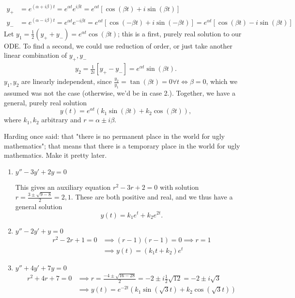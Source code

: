 \begin{enumerate}
    \begin{align*}
        y_+ &= e^{(\alpha + i \beta)t} = e^{\alpha t}e^{i \beta t}= e^{\alpha t}[\cos (\beta t) + i \sin (\beta t)]\\
        y_- &= e^{(\alpha - i \beta )t} = e^{\alpha t}e^{-i \beta t}= e^{\alpha t}[\cos (-\beta t) + i \sin (-\beta t)] = e^{\alpha t}[\cos (\beta t) - i \sin (\beta t)]
    \end{align*}
    Let $y_1 = \frac{1}{2}(y_+ + y_-) = e^{\alpha t} \cos(\beta t)$; this is a first, purely real solution to our ODE. To find a second, we could use reduction of order, or just take another linear combination of $y_+, y_-$
    \begin{align*}
        y_2 = \frac{1}{2i}[y_+ - y_-] = e^{\alpha t}\sin (\beta t).
    \end{align*}
    $y_1, y_2$ are linearly independent, since $\frac{y_2}{y_1} = \tan (\beta t) = 0 \forall t \iff \beta = 0$, which we assumed was not the case (otherwise, we'd be in case 2.).
    Together, we have a general, purely real solution \[
    y(t) = e^{\alpha t}(k_1\sin(\beta t) +k_2\cos (\beta t)),    
    \]
    where $k_1, k_2$ arbitrary and $r = \alpha \pm i \beta$.
\end{enumerate}

\begin{mdframed}[backgroundcolor=gray!20]
    \begin{center}
    Harding once said: that "there is no permanent place in the world for ugly mathematics"; that means that there is a temporary place in the world for ugly mathematics. Make it pretty later.
    \end{center}
\end{mdframed}


\begin{example}
    \begin{enumerate}
        \item $y'' - 3y' + 2y = 0$ 
        
        This gives an auxiliary equation $r^2 - 3r + 2 = 0$ with solution $r = \frac{3 \pm \sqrt{9 - 8}}{2} = 2, 1$. These are both positive and real, and we thus have a general solution \[
        y(t) = k_1 e^{t} + k_2e^{2t}.    
        \]
        \item $y''-2y'+y = 0$
        \begin{align*}
            r^2 - 2r + 1 = 0 &\implies (r-1)(r-1) = 0 \implies r = 1\\
            &\implies y(t) = (k_1t+k_2)e^{t}
        \end{align*}
        \item $y''+4y'+7y = 0$
        \begin{align*}
            r^2 + 4r + 7 = 0 &\implies r = \frac{-4 \pm \sqrt{16-28}}{2}= -2 \pm i \frac{1}{2}\sqrt{12} = -2 \pm i \sqrt{3}\\
            &\implies y(t) = e^{-2t}(k_1 \sin (\sqrt{3}t) + k_2 \cos (\sqrt{3}t))
        \end{align*}
    \end{enumerate}
\end{example}
